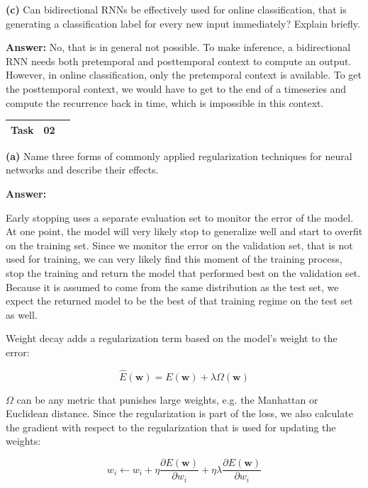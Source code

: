 \textbf{(c)} Can bidirectional RNNs be effectively used for online classification, that is generating a classification label for every new input immediately? Explain briefly.

\textbf{Answer:} No, that is in general not possible. To make inference, a bidirectional RNN needs both pretemporal and posttemporal context to compute an output. However, in  online classification, only the pretemporal context is available. To get the posttemporal context, we would have to get to the end of a timeseries and compute the recurrence back in time, which is impossible in this context.


\begin{center}
	\begin{tabular}{|rlp{11cm}|}
		\hline
		\textbf{Task} & 02 & \\ \hline
	\end{tabular}
\end{center} 

\textbf{(a)} Name three forms of commonly applied regularization techniques for neural networks and describe their effects.

\textbf{Answer:}

Early stopping uses a separate evaluation set to monitor the error of the model. At one point, the model will very likely stop to generalize well and start to overfit on the training set. Since we monitor the error on the validation set, that is not used for training, we can very likely find this moment of the training process, stop the training and return the model that performed best on the validation set. Because it is assumed to come from the same distribution as the test set, we expect the returned model to be the best of that training regime on the test set as well.

Weight decay adds a regularization term based on the model's weight to the error:

\begin{equation}
	\hat{E}(\mathbf{w}) = E(\mathbf{w}) + \lambda \Omega(\mathbf{w})
\end{equation}

$\Omega$ can be any metric that punishes large weights, e.g. the Manhattan or Euclidean distance. Since the regularization is part of the loss, we also calculate the gradient with respect to the regularization that is used for updating the weights:

\begin{equation}
	w_i \leftarrow w_i + \eta \frac{\partial E(\mathbf{w})}{\partial w_i} + \eta \lambda \frac{\partial E(\mathbf{w})}{\partial w_i}
\end{equation}

